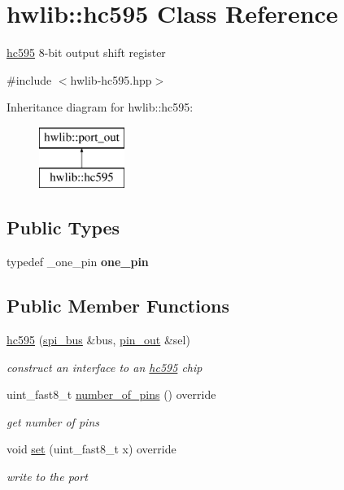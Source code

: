 \hypertarget{classhwlib_1_1hc595}{}\section{hwlib\+:\+:hc595 Class Reference}
\label{classhwlib_1_1hc595}


\hyperlink{classhwlib_1_1hc595}{hc595} 8-\/bit output shift register  




{\ttfamily \#include $<$hwlib-\/hc595.\+hpp$>$}

Inheritance diagram for hwlib\+:\+:hc595\+:\begin{figure}[H]
\begin{center}
\leavevmode
\includegraphics[height=2.000000cm]{classhwlib_1_1hc595}
\end{center}
\end{figure}
\subsection*{Public Types}
\begin{DoxyCompactItemize}
\item 
typedef \+\_\+one\+\_\+pin {\bfseries one\+\_\+pin}\hypertarget{classhwlib_1_1hc595_a9c90bea07c20efa7e90191c25a2ecb35}{}\label{classhwlib_1_1hc595_a9c90bea07c20efa7e90191c25a2ecb35}

\end{DoxyCompactItemize}
\subsection*{Public Member Functions}
\begin{DoxyCompactItemize}
\item 
\hyperlink{classhwlib_1_1hc595_a293236ae5bd14fa376d8b540324f07c0}{hc595} (\hyperlink{classhwlib_1_1spi__bus}{spi\+\_\+bus} \&bus, \hyperlink{classhwlib_1_1pin__out}{pin\+\_\+out} \&sel)
\begin{DoxyCompactList}\small\item\em construct an interface to an \hyperlink{classhwlib_1_1hc595}{hc595} chip \end{DoxyCompactList}\item 
uint\+\_\+fast8\+\_\+t \hyperlink{classhwlib_1_1hc595_a89c7b21cb99d61c91f764a0fdb7ceb9b}{number\+\_\+of\+\_\+pins} () override
\begin{DoxyCompactList}\small\item\em get number of pins \end{DoxyCompactList}\item 
void \hyperlink{classhwlib_1_1hc595_ad2b4d6fa77114f1f13348075389efd1c}{set} (uint\+\_\+fast8\+\_\+t x) override
\begin{DoxyCompactList}\small\item\em write to the port \end{DoxyCompactList}\end{DoxyCompactItemize}
